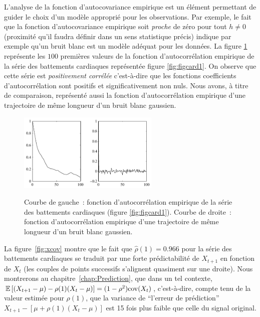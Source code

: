 L'analyse de la fonction d'autocovariance empirique est un \'el\'ement
permettant de guider le choix d'un mod\`ele appropri\'e pour les
observations. Par exemple, le fait que la fonction
d'autocovariance empirique soit \emph{proche} de z\'ero pour tout
$h \ne 0$ (proximit\'e qu'il faudra d\'efinir dans un sens statistique
pr\'ecis) indique par exemple qu'un bruit blanc est un mod\`ele
ad\'equat pour les donn\'ees. La figure \ref{fig:xcorrhr} repr\'esente
les $100$ premi\`eres valeurs de la fonction d'autocorr\'elation
empirique de la s\'erie des battements cardiaques repr\'esent\'ee figure
\ref{fig:figcard1}. On observe que cette s\'erie est
\emph{positivement corr\'el\'ee} c'est-\`a-dire que les fonctions
coefficients d'autocorr\'elation sont positifs et significativement
non nuls. Nous avons, \`a titre de comparaison, repr\'esent\'e aussi la
fonction d'autocorr\'elation empirique d'une trajectoire de m\^{e}me
longueur d'un bruit blanc gaussien.
\begin{figure}
  \centering
  \includegraphics[width=0.6\textwidth]{Figures/corrHR11839}\\
  \caption{Courbe de gauche~: fonction d'autocorr\'elation empirique de la s\'erie
 des battements cardiaques (figure \ref{fig:figcard1}). Courbe de droite~:
 fonction d'autocorr\'elation
 empirique d'une trajectoire de m\^{e}me longueur d'un bruit blanc
 gaussien.}\label{fig:xcorrhr}
\end{figure}
 La figure~\ref{fig:xcov} montre que le fait que $\hat{\rho}(1)
 = 0.966$ pour la s\'erie des battements cardiaques se traduit par une forte
 pr\'edictabilit\'e de $X_{t+1}$ en fonction de $X_t$ (les couples de points
 successifs s'alignent quasiment sur une droite). Nous montrerons au
 chapitre~\ref{chap:Prediction}, que dans un tel contexte,
 ${\mathbb E}\left[ (X_{t+1}-\mu)-\rho(1)(X_t-\mu) \right] = (1-\rho^2) \mathrm{cov}(X_t)$, c'est-\`a-dire,
 compte tenu de la valeur estim\'ee pour $\rho(1)$, que la variance de ``l'erreur
 de pr\'ediction'' $X_{t+1}-[\mu+\rho(1)(X_t-\mu)]$ est 15 fois plus faible que
 celle du signal original.
